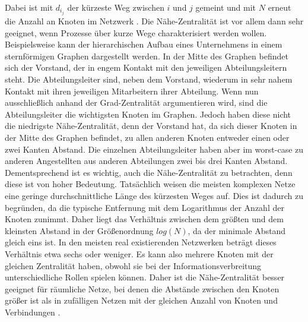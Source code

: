 Dabei ist mit $d_i_j$ der kürzeste Weg zwischen $i$ und $j$ gemeint und mit $N$ erneut die Anzahl an Knoten im Netzwerk \cite{SpringerElbert}. Die Nähe-Zentralität ist vor allem dann sehr geeignet, wenn Prozesse über kurze Wege charakterisiert werden wollen. Beispielsweise kann der hierarchischen Aufbau eines Unternehmens in einem sternförmigen Graphen dargestellt werden. In der Mitte des Graphen befindet sich der Vorstand, der in engem Kontakt mit den jeweiligen Abteilungsleitern steht. Die Abteilungsleiter sind, neben dem Vorstand, wiederum in sehr nahem Kontakt mit ihren jeweiligen Mitarbeitern ihrer Abteilung. Wenn nun ausschließlich anhand der Grad-Zentralität argumentieren wird, sind die Abteilungsleiter die wichtigsten Knoten im Graphen. Jedoch haben diese nicht die niedrigste Nähe-Zentralität, denn der Vorstand hat, da sich dieser Knoten in der Mitte des Graphen befindet, zu allen anderen Knoten entweder einen oder zwei Kanten Abstand. Die einzelnen Abteilungsleiter haben aber im worst-case zu anderen Angestellten aus anderen Abteilungen zwei bis drei Kanten Abstand. Dementsprechend ist es wichtig, auch die Nähe-Zentralität zu betrachten, denn diese ist von hoher Bedeutung. Tatsächlich weisen die meisten komplexen Netze eine geringe durchschnittliche Länge des kürzesten Weges auf. Dies ist dadurch zu begründen, da die typische Entfernung mit dem Logarithmus der Anzahl der Knoten zunimmt. 
Daher liegt das Verhältnis zwischen dem größten und dem kleinsten Abstand
in der Größenordnung $log(N)$, da der minimale Abstand gleich eins ist. In den meisten real existierenden
Netzwerken beträgt dieses Verhältnis etwa sechs oder weniger. Es kann also mehrere Knoten mit der gleichen
Zentralität haben, obwohl sie bei der Informationsverbreitung unterschiedliche Rollen spielen können. Daher ist die Nähe-Zentralität besser geeignet für räumliche Netze, bei denen die Abstände zwischen den Knoten größer ist als in zufälligen Netzen mit der gleichen Anzahl von
Knoten und Verbindungen \cite{SpringerElbert}.

